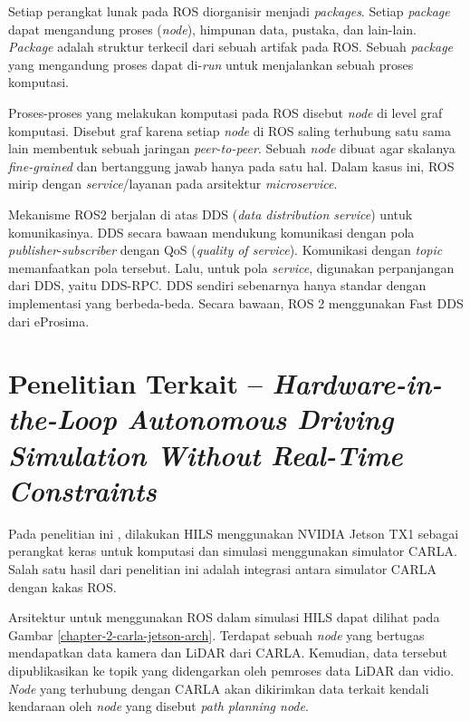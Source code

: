 Setiap perangkat lunak pada ROS diorganisir menjadi \textit{packages}. Setiap
\textit{package} dapat mengandung proses (\textit{node}), himpunan data,
pustaka, dan lain-lain. \textit{Package} adalah struktur terkecil dari sebuah
artifak pada ROS. Sebuah \textit{package} yang mengandung proses dapat
di-\textit{run} untuk menjalankan sebuah proses komputasi.

Proses-proses yang melakukan komputasi pada ROS disebut \textit{node} di level
graf komputasi. Disebut graf karena setiap \textit{node} di ROS saling terhubung
satu sama lain membentuk sebuah jaringan \textit{peer-to-peer}. Sebuah
\textit{node} dibuat agar skalanya \textit{fine-grained} dan bertanggung jawab
hanya pada satu hal. Dalam kasus ini, ROS mirip dengan \textit{service}/layanan
pada arsitektur \textit{microservice}.

Mekanisme ROS2 berjalan di atas DDS (\textit{data distribution service}) untuk
komunikasinya. DDS secara bawaan mendukung komunikasi dengan pola
\textit{publisher}-\textit{subscriber} dengan QoS (\textit{quality of service}).
Komunikasi dengan \textit{topic} memanfaatkan pola tersebut. Lalu, untuk pola
\textit{service}, digunakan perpanjangan dari DDS, yaitu DDS-RPC. DDS sendiri
sebenarnya hanya standar dengan implementasi yang berbeda-beda. Secara bawaan,
ROS 2 menggunakan Fast DDS dari eProsima.

\section{Penelitian Terkait -- \textit{Hardware-in-the-Loop Autonomous Driving Simulation Without
	  Real-Time Constraints}}\label{chapter-2-section-related-works}

Pada penelitian ini \parencite{brogle_CarlaHILS}, dilakukan HILS menggunakan
NVIDIA Jetson TX1 sebagai perangkat keras untuk komputasi dan simulasi
menggunakan simulator CARLA. Salah satu hasil dari penelitian ini adalah
integrasi antara simulator CARLA dengan kakas ROS.

Arsitektur untuk menggunakan ROS dalam simulasi HILS dapat dilihat pada Gambar
\ref{chapter-2-carla-jetson-arch}. Terdapat sebuah \textit{node}  yang
bertugas mendapatkan data kamera dan LiDAR dari CARLA. Kemudian, data tersebut
dipublikasikan ke topik yang didengarkan oleh pemroses data LiDAR dan vidio.
\textit{Node} yang terhubung dengan CARLA akan dikirimkan data terkait kendali
kendaraan oleh \textit{node} yang disebut \textit{path planning node}.


